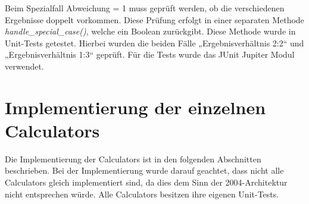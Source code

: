 Beim Spezialfall Abweichung = 1 muss geprüft werden, ob die verschiedenen Ergebnisse doppelt vorkommen. Diese Prüfung erfolgt in einer separaten Methode \textit{handle_special_case()}, welche ein Boolean zurückgibt. Diese Methode wurde in Unit-Tests getestet. Hierbei wurden die beiden Fälle „Ergebnisverhältnis 2:2“ und „Ergebnisverhältnis 1:3“ geprüft. Für die Tests wurde das JUnit Jupiter Modul verwendet.


\section{Implementierung der einzelnen Calculators}
Die Implementierung der Calculators ist in den folgenden Abschnitten beschrieben. Bei der Implementierung wurde darauf geachtet, dass nicht alle Calculators gleich implementiert sind, da dies dem Sinn der 2004-Architektur nicht entsprechen würde. Alle Calculators besitzen ihre eigenen Unit-Tests. 

